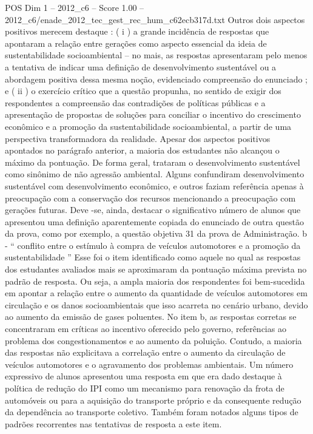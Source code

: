 \begin{textsample}{POS Dim 1 – 2012\_c6 – Score 1.00 – 2012\_c6/enade\_2012\_tec\_gest\_rec\_hum\_c62ecb317d.txt}
Outros dois aspectos positivos merecem destaque : ( i ) a grande incidência de respostas que apontaram a relação entre gerações como aspecto essencial da ideia de sustentabilidade socioambiental – no mais, as respostas apresentaram pelo menos a tentativa de indicar uma definição de desenvolvimento sustentável ou a abordagem positiva dessa mesma noção, evidenciado compreensão do enunciado ; e ( ii ) o exercício crítico que a questão propunha, no sentido de exigir dos respondentes a compreensão das contradições de políticas públicas e a apresentação de propostas de soluções para conciliar o incentivo do crescimento econômico e a promoção da sustentabilidade socioambiental, a partir de uma perspectiva transformadora da realidade.
Apesar dos aspectos positivos apontados no parágrafo anterior, a maioria dos estudantes não alcançou o máximo da pontuação.
De forma geral, trataram o desenvolvimento sustentável como sinônimo de não agressão ambiental.
Alguns confundiram desenvolvimento sustentável com desenvolvimento econômico, e outros faziam referência apenas à preocupação com a conservação dos recursos mencionando a preocupação com gerações futuras.
Deve -se, ainda, destacar o significativo número de alunos que apresentou uma definição aparentemente copiada do enunciado de outra questão da prova, como por exemplo, a questão objetiva 31 da prova de Administração. b - “ conflito entre o estímulo à compra de veículos automotores e a promoção da sustentabilidade ” Esse foi o item identificado como aquele no qual as respostas dos estudantes avaliados mais se aproximaram da pontuação máxima prevista no padrão de resposta.
Ou seja, a ampla maioria dos respondentes foi bem-sucedida em apontar a relação entre o aumento da quantidade de veículos automotores em circulação e os danos socioambientais que isso acarreta no cenário urbano, devido ao aumento da emissão de gases poluentes.
No item b, as respostas corretas se concentraram em críticas ao incentivo oferecido pelo governo, referências ao problema dos congestionamentos e ao aumento da poluição.
Contudo, a maioria das respostas não explicitava a correlação entre o aumento da circulação de veículos automotores e o agravamento dos problemas ambientais.
Um número expressivo de alunos apresentou uma resposta em que era dado destaque à política de redução do IPI como um mecanismo para renovação da frota de automóveis ou para a aquisição do transporte próprio e da consequente redução da dependência ao transporte coletivo.
Também foram notados alguns tipos de padrões recorrentes nas tentativas de resposta a este item.

\end{textsample}

